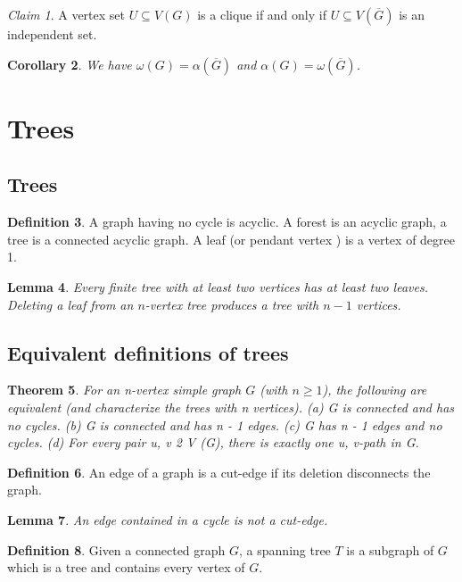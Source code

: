 \documentclass[11pt, fleqn, a4paper, landscape]{article}
\theoremstyle{plain} %
\newtheorem{thm}{Theorem}
\newtheorem{lem}[thm]{Lemma}
\newtheorem{cor}[thm]{Corollary}
\theoremstyle{remark} %
\newtheorem{claim}[thm]{Claim}
\theoremstyle{definition} %
\newtheorem{defi}[thm]{Definition}
\begin{document}
\begin{multicols}{3}
\begin{claim}
A vertex set $U\subseteq V (G)$ is a clique if and only if $U\subseteq V(\overline{G})$ is an independent set.
\end{claim}

\begin{cor}
We have $\omega(G)=\alpha(\overline{G})$ and $\alpha(G)=\omega(\overline{G})$.
\end{cor}

\section{Trees}
\subsection{Trees}
\begin{defi}
A graph having no cycle is acyclic. A forest is an acyclic graph, a tree is a connected acyclic graph. A leaf (or pendant vertex ) is a vertex of degree 1.
\end{defi}
\addtocounter{thm}{1}
\begin{lem}
Every finite tree with at least two vertices has at least two leaves. Deleting a leaf from an $n$-vertex tree produces a tree with $n-1$ vertices.
\end{lem}

\subsection{Equivalent definitions of trees}

\begin{thm}
For an n-vertex simple graph $G$ (with $n \ge 1$), the following are equivalent (and
characterize the trees with n vertices).
(a) G is connected and has no cycles.
(b) G is connected and has n - 1 edges.
(c) G has n - 1 edges and no cycles.
(d) For every pair u, v 2 V (G), there is exactly one u, v-path in G.
\end{thm}

\begin{defi}
An edge of a graph is a cut-edge if its deletion disconnects the graph.
\end{defi}

\begin{lem}
An edge contained in a cycle is not a cut-edge.
\end{lem}


\begin{defi}
Given a connected graph $G$, a spanning tree $T$ is a subgraph of $G$ which is a tree and contains every vertex of $G$.
\end{defi}


\end{multicols}
\end{document}
